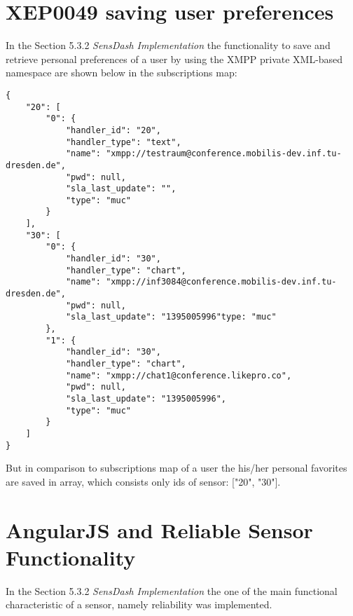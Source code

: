 \chapter{XEP0049 saving user preferences}
In the Section 5.3.2 \emph{SensDash Implementation} the functionality to save and retrieve personal preferences of a user by using the XMPP private XML-based namespace are shown below in the subscriptions map:
\begin{lstlisting}
{
    "20": [
        "0": {
            "handler_id": "20",
            "handler_type": "text",
            "name": "xmpp://testraum@conference.mobilis-dev.inf.tu-dresden.de",
            "pwd": null,
            "sla_last_update": "",
            "type": "muc"
        }
    ],
    "30": [
        "0": {
            "handler_id": "30",
            "handler_type": "chart",
            "name": "xmpp://inf3084@conference.mobilis-dev.inf.tu-dresden.de",
            "pwd": null,
            "sla_last_update": "1395005996"type: "muc"
        },
        "1": {
            "handler_id": "30",
            "handler_type": "chart",
            "name": "xmpp://chat1@conference.likepro.co",
            "pwd": null,
            "sla_last_update": "1395005996",
            "type": "muc"
        }
    ]
}
\end{lstlisting}
But in comparison to subscriptions map of a user the his/her personal favorites are saved in array, which consists only ids of sensor: ["20", "30"].

\chapter{AngularJS and Reliable Sensor Functionality}
In the Section 5.3.2 \emph{SensDash Implementation} the one of the main functional characteristic of a sensor, namely reliability was implemented.

